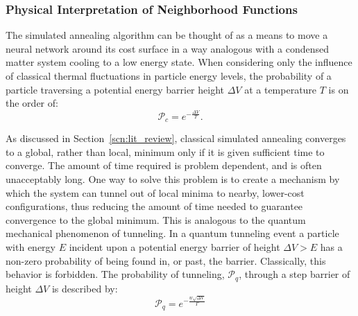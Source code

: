 \documentclass[10pt,journal,cspaper,compsoc]{IEEEtran}
\begin{document}
\subsubsection{Physical Interpretation of Neighborhood Functions}
\label{scn:physical_interpretation_simulated_annealing}



The simulated annealing algorithm can be thought of as a means to move a neural network around its cost surface in a way analogous with a condensed matter system cooling to a low energy state. When considering only the influence of classical thermal fluctuations in particle energy levels, the probability of a particle traversing a potential energy barrier height \begin{math} \Delta V \end{math} at a temperature \begin{math} T \end{math} is on the order of: \begin{equation} \label{eq:thermal_transistion_prob}
\mathcal{P}_{c} = e^{-\frac{\Delta V}{T}}.
\end{equation}

As discussed in Section~\ref{scn:lit_review}, classical simulated annealing converges to a global, rather than local, minimum only if it is given sufficient time to converge. The amount of time required is problem dependent, and is often unacceptably long. One way to solve this problem is to create a mechanism by which the system can tunnel out of local minima to nearby, lower-cost configurations, thus reducing the amount of time needed to guarantee convergence to the global minimum. This is analogous to the quantum mechanical phenomenon of tunneling. In a quantum tunneling event a particle with energy \begin{math} E \end{math} incident upon a potential energy barrier of height \begin{math} \Delta V > E  \end{math} has a non-zero probability of being found in, or past, the barrier. Classically, this behavior is forbidden. The probability of tunneling, \begin{math} \mathcal{P}_{q} \end{math}, through a step barrier of height \begin{math} \Delta V  \end{math} is described by: 
\begin{equation} \label{eq:quantum_transition_prob}
\mathcal{P}_{q} = e^{-\frac{w \sqrt{\Delta V}}{ \Gamma}} 
\end{equation}
\end{document}
